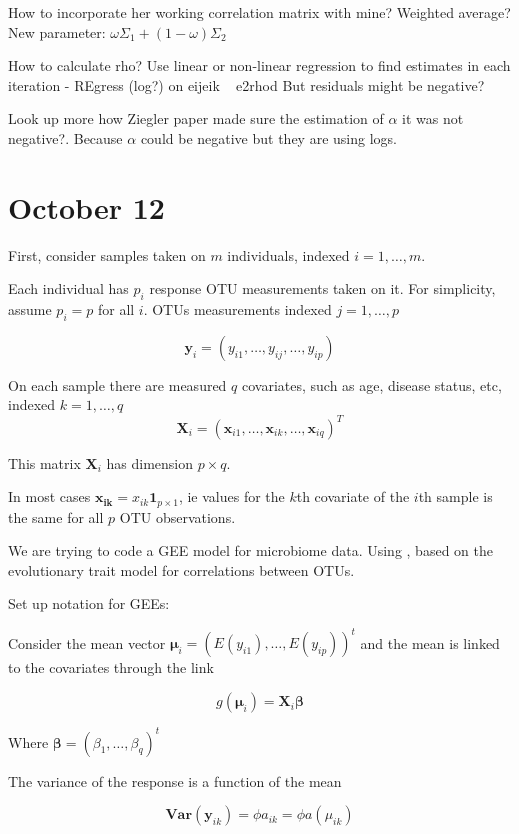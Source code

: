 \documentclass[10pt]{article}
\begin{document}
How to incorporate her working correlation matrix with mine? Weighted average? New parameter: $\omega \Sigma_1 + (1 - \omega)\Sigma_2$

How to calculate rho? Use linear or non-linear regression to find estimates in each iteration
- REgress (log?) on eijeik ~ e2rhod
But residuals might be negative?

Look up more how Ziegler paper made sure the estimation of $\alpha$ it was not negative?. Because $\alpha$ could be negative but they are using logs.



\section{October 12}

First, consider samples taken on $m$ individuals, indexed $i = 1, \ldots , m$.


Each individual has $p_i$ response OTU measurements taken on it. For simplicity, assume $p_i = p$ for all $i$. OTUs measurements indexed $j = 1, \ldots , p $

$$\mathbf{y}_i = (y_{i1}, \ldots, y_{ij}, \ldots , y_{ip})$$




On each sample there are measured $q$ covariates, such as age, disease status, etc, indexed $k = 1, \ldots, q$
$$\mathbf{X}_i = (\mathbf{x}_{i1}, \ldots, \mathbf{x}_{ik}, \ldots , \mathbf{x}_{iq})^T$$

This matrix $\mathbf{X}_i$ has dimension $p \times q$.

In most cases $\mathbf{x_{ik}} = x_{ik}\boldsymbol{1}_{p \times 1}$, ie values for the $k$th covariate of the $i$th sample is the same for all $p$ OTU observations.


We are trying to code a GEE model for microbiome data. Using \cite{Xiao2018}, based on the evolutionary trait model for correlations between OTUs.


Set up notation for GEEs:

Consider the mean vector $\boldsymbol\mu_i = (E(y_{i1}), \ldots , E(y_{ip}))^t$ and the mean is linked to the covariates through the link

$$g(\boldsymbol\mu_i ) = \mathbf{X}_i \boldsymbol\beta$$

Where $\boldsymbol\beta = (\beta_1 , \ldots , \beta_q)^t$

The variance of the response is a function of the mean

$$\textbf{Var}(\mathbf{y}_{ik}) = \phi a_{ik} = \phi a(\mu_{ik})$$
\end{document}
